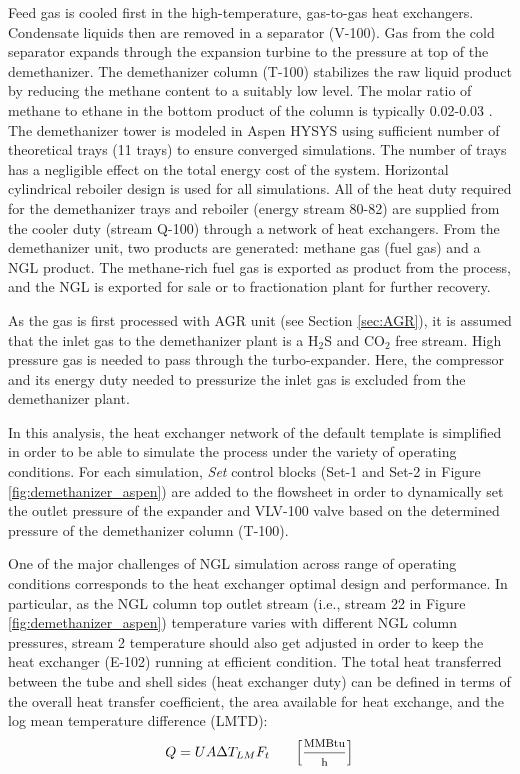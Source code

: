 \documentclass[11pt]{report}
\begin{document}
Feed gas is cooled first in the high-temperature, gas-to-gas heat exchangers. Condensate liquids then are removed in a separator (V-100). Gas from the cold separator expands through the expansion turbine to the pressure at top of the demethanizer. The demethanizer column (T-100) stabilizes the raw liquid product by reducing the methane content to a suitably low level. The molar ratio of methane to ethane in the bottom product of the column is typically 0.02-0.03 \cite{Manning1991}. The demethanizer tower is modeled in Aspen HYSYS using sufficient number of theoretical trays (11 trays) to ensure converged simulations. The number of trays has a negligible effect on the total energy cost of the system. Horizontal cylindrical reboiler design is used for all simulations. All of the heat duty required for the demethanizer trays and reboiler (energy stream 80-82) are supplied from the cooler duty (stream Q-100) through a network of heat exchangers. From the demethanizer unit, two products are generated: methane gas (fuel gas) and a NGL product. The methane-rich fuel gas is exported as product from the process, and the NGL is exported for sale or to fractionation plant for further recovery. 

As the gas is first processed with AGR unit (see Section \ref{sec:AGR}), it is assumed that the inlet gas to the demethanizer plant is a H$_2$S and CO$_2$ free stream. High pressure gas is needed to pass through the turbo-expander. Here, the compressor and its energy duty needed to pressurize the inlet gas is excluded from the demethanizer plant. 

In this analysis, the heat exchanger network of the default template is simplified in order to be able to simulate the process under the variety of operating conditions. For each simulation, \emph{Set} control blocks (Set-1 and Set-2 in Figure \ref{fig:demethanizer_aspen}) are added to the flowsheet in order to dynamically set the outlet pressure of the expander and VLV-100 valve based on the determined pressure of the demethanizer column (T-100). 

One of the major challenges of NGL simulation across range of operating conditions corresponds to the heat exchanger optimal design and performance. In particular, as the NGL column top outlet stream (i.e., stream 22 in Figure \ref{fig:demethanizer_aspen}) temperature varies with different NGL column pressures, stream 2 temperature should also get adjusted in order to keep the heat exchanger (E-102) running at efficient condition. The total heat transferred between the tube and shell sides (heat exchanger duty) can be defined in terms of the overall heat transfer coefficient, the area available for heat exchange, and the log mean temperature difference (LMTD):
\begin{equation} \label{eq:shell_and_tube_HE}
Q=UA\Delta T_{LM}F_{t} \begin{footnotesize} \quad\quad\left[\frac{\text{MMBtu}}{\text{h}}\right] \end{footnotesize}
\end{equation}
\end{document}
